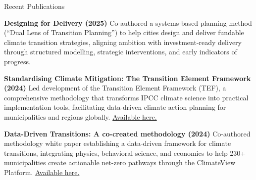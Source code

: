 \documentclass{resume} %
\begin{document}

\begin{rSection}{Recent Publications}
  \vspace{-1.25em}
\item \textbf{Designing for Delivery (2025)} {Co-authored a systems-based planning method (``Dual Lens of Transition Planning'') to help cities design and deliver fundable climate transition strategies, aligning ambition with investment-ready delivery through structured modelling, strategic interventions, and early indicators of progress.}

\item \textbf{Standardising Climate Mitigation: The Transition Element Framework (2024)} {Led development of the Transition Element Framework (TEF), a comprehensive methodology that transforms IPCC climate science into practical implementation tools, facilitating data-driven climate action planning for municipalities and regions globally. \href{https://www.transitionelements.org/downloads/white_paper_standardising_climate_mitigation.pdf}{Available here.}}
\item \textbf{Data-Driven Transitions: A co-created methodology (2024)} {Co-authored methodology white paper establishing a data-driven framework for climate transitions, integrating physics, behavioral science, and economics to help 230+ municipalities create actionable net-zero pathways through the ClimateView Platform. \href{https://www.transitionelements.org/downloads/white_paper_data_driven_transitions_2024_09_01.pdf}{Available here.}
}
\end{rSection} 
\end{document}
